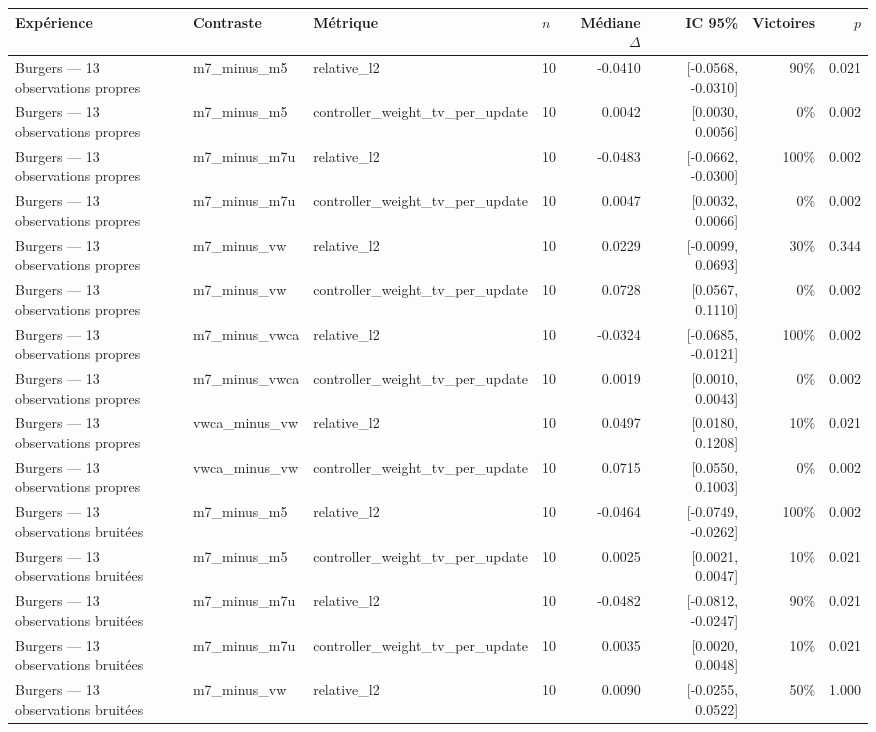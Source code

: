 \begin{tabular}{llllrrrr}
\toprule
Expérience & Contraste & Métrique & $n$ & Médiane $\Delta$ & IC 95\% & Victoires & $p$ \\
\midrule
Burgers — 13 observations propres & m7\_minus\_m5 & relative\_l2 & 10 & -0.0410 & [-0.0568, -0.0310] & 90\% & 0.021 \\
Burgers — 13 observations propres & m7\_minus\_m5 & controller\_weight\_tv\_per\_update & 10 & 0.0042 & [0.0030, 0.0056] & 0\% & 0.002 \\
Burgers — 13 observations propres & m7\_minus\_m7u & relative\_l2 & 10 & -0.0483 & [-0.0662, -0.0300] & 100\% & 0.002 \\
Burgers — 13 observations propres & m7\_minus\_m7u & controller\_weight\_tv\_per\_update & 10 & 0.0047 & [0.0032, 0.0066] & 0\% & 0.002 \\
Burgers — 13 observations propres & m7\_minus\_vw & relative\_l2 & 10 & 0.0229 & [-0.0099, 0.0693] & 30\% & 0.344 \\
Burgers — 13 observations propres & m7\_minus\_vw & controller\_weight\_tv\_per\_update & 10 & 0.0728 & [0.0567, 0.1110] & 0\% & 0.002 \\
Burgers — 13 observations propres & m7\_minus\_vwca & relative\_l2 & 10 & -0.0324 & [-0.0685, -0.0121] & 100\% & 0.002 \\
Burgers — 13 observations propres & m7\_minus\_vwca & controller\_weight\_tv\_per\_update & 10 & 0.0019 & [0.0010, 0.0043] & 0\% & 0.002 \\
Burgers — 13 observations propres & vwca\_minus\_vw & relative\_l2 & 10 & 0.0497 & [0.0180, 0.1208] & 10\% & 0.021 \\
Burgers — 13 observations propres & vwca\_minus\_vw & controller\_weight\_tv\_per\_update & 10 & 0.0715 & [0.0550, 0.1003] & 0\% & 0.002 \\
Burgers — 13 observations bruitées & m7\_minus\_m5 & relative\_l2 & 10 & -0.0464 & [-0.0749, -0.0262] & 100\% & 0.002 \\
Burgers — 13 observations bruitées & m7\_minus\_m5 & controller\_weight\_tv\_per\_update & 10 & 0.0025 & [0.0021, 0.0047] & 10\% & 0.021 \\
Burgers — 13 observations bruitées & m7\_minus\_m7u & relative\_l2 & 10 & -0.0482 & [-0.0812, -0.0247] & 90\% & 0.021 \\
Burgers — 13 observations bruitées & m7\_minus\_m7u & controller\_weight\_tv\_per\_update & 10 & 0.0035 & [0.0020, 0.0048] & 10\% & 0.021 \\
Burgers — 13 observations bruitées & m7\_minus\_vw & relative\_l2 & 10 & 0.0090 & [-0.0255, 0.0522] & 50\% & 1.000 \\

\end{tabular}
